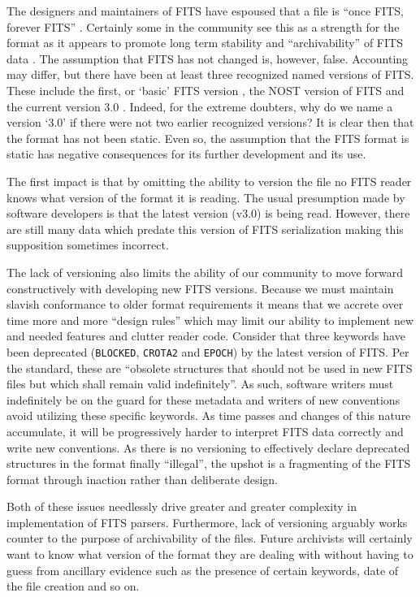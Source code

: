 \documentclass[final,authoryear,5p,times,twocolumn]{elsarticle}
\begin{document}
{{The designers and maintainers of FITS have espoused that a file is
``once FITS, forever FITS'' \citep[see e.g.,][]{1988A&AS...73..359G,1993FITS1}.
Certainly some in the community see this as a strength for the format
as it appears to promote long term stability and ``archivability'' of FITS
data \citep{2012EWASSAlle,2012LOC}. The assumption that FITS has not changed
is, however, false. Accounting may differ, but there have been at least three
recognized named versions of FITS. These include the first, or `basic' FITS
version \citep{1979ipia.coll..445W}, the NOST version of FITS
\citep{2001A&A...376..359H} and the current version 3.0 \citep{2010A&A...524A..42P}.
Indeed, for the extreme doubters, why do we name a version `3.0' if there
were not two earlier recognized versions? It is clear then that the format
has not been static.  Even so, the assumption that the FITS format is static
has negative consequences for its further development and its use.


The first impact is that by omitting the ability to version the file no
FITS reader knows what version of the format it is reading. The usual
presumption made by software developers is that the latest version (v3.0)
is being read. However, there are still many data which predate
this version of FITS serialization making this supposition sometimes
incorrect.


The lack of versioning also limits the ability of our community to
move forward constructively with developing new FITS versions.
Because we must maintain slavish conformance to older format requirements
it means that we accrete over time more and more ``design rules''
which may limit our ability to implement new and needed features and
clutter reader code. Consider that three keywords have been deprecated
(\texttt{BLOCKED}, \texttt{CROTA2} and \texttt{EPOCH}) by the latest version
of FITS. Per the standard, these are ``obsolete structures that should not be
used in new FITS files but which shall remain valid indefinitely''.
As such, software writers must indefinitely be on the guard for these metadata
and writers of new conventions avoid utilizing these specific keywords.
As time passes and changes of this nature accumulate, it will be progressively
harder to interpret FITS data correctly and write new conventions.
As there is no versioning to effectively declare deprecated structures in the
format finally ``illegal'', the upshot is a fragmenting of the FITS format through
inaction rather than deliberate design.


Both of these issues needlessly drive greater and greater complexity
in implementation of FITS parsers. Furthermore, lack of versioning
arguably works counter to the purpose of archivability of the files.
Future archivists will certainly want to know what version of the
format they are dealing with without having to guess from ancillary
evidence such as the presence of certain keywords, date of the file
creation and so on.


}}
\end{document}
